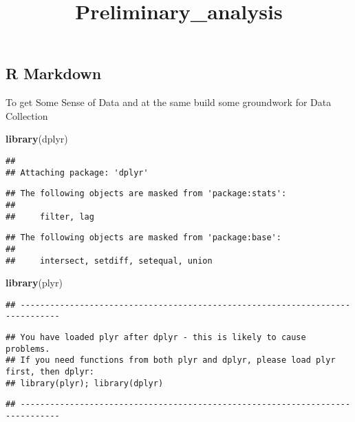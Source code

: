 \documentclass[
]{article}
\title{Preliminary\_analysis}
\author{}
\date{\vspace{-2.5em}}
\newenvironment{Shaded}{\begin{snugshade}}{\end{snugshade}}
\newcommand{\KeywordTok}[1]{\textcolor[rgb]{0.13,0.29,0.53}{\textbf{#1}}}
\newcommand{\NormalTok}[1]{#1}
\begin{document}
\maketitle

\hypertarget{r-markdown}{%
\subsection{R Markdown}\label{r-markdown}}

To get Some Sense of Data and at the same build some groundwork for Data
Collection

\begin{Shaded}
\begin{Highlighting}[]
\KeywordTok{library}\NormalTok{(dplyr)}
\end{Highlighting}
\end{Shaded}

\begin{verbatim}
## 
## Attaching package: 'dplyr'
\end{verbatim}

\begin{verbatim}
## The following objects are masked from 'package:stats':
## 
##     filter, lag
\end{verbatim}

\begin{verbatim}
## The following objects are masked from 'package:base':
## 
##     intersect, setdiff, setequal, union
\end{verbatim}

\begin{Shaded}
\begin{Highlighting}[]
\KeywordTok{library}\NormalTok{(plyr)}
\end{Highlighting}
\end{Shaded}

\begin{verbatim}
## ------------------------------------------------------------------------------
\end{verbatim}

\begin{verbatim}
## You have loaded plyr after dplyr - this is likely to cause problems.
## If you need functions from both plyr and dplyr, please load plyr first, then dplyr:
## library(plyr); library(dplyr)
\end{verbatim}

\begin{verbatim}
## ------------------------------------------------------------------------------
\end{verbatim}
\end{document}
